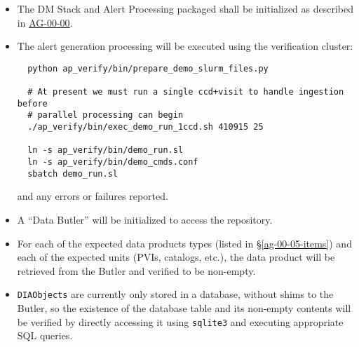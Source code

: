 \begin{itemize}

  \item{The DM Stack and Alert Processing packaged shall be initialized 
  as described in \hyperref[ag-00-00]{AG-00-00}.}

  \item{The alert generation processing will be executed using the verification cluster:

  \begin{verbatim}
  python ap_verify/bin/prepare_demo_slurm_files.py

  # At present we must run a single ccd+visit to handle ingestion before 
  # parallel processing can begin
  ./ap_verify/bin/exec_demo_run_1ccd.sh 410915 25

  ln -s ap_verify/bin/demo_run.sl
  ln -s ap_verify/bin/demo_cmds.conf
  sbatch demo_run.sl
  \end{verbatim}

  and any errors or failures reported.}


  \item{A ``Data Butler'' will be initialized to access the repository.}

  \item{For each of the expected data products types (listed in \S\ref{ag-00-05-items})
  and each of the expected units (PVIs, catalogs, etc.), the data product will be
    retrieved from the Butler and verified to be non-empty.}

  \item{\texttt{DIAObjects} are currently only stored in a database, without
  shims to the Butler, so the existence of the database table and its
  non-empty contents will be verified by directly accessing it using
  \texttt{sqlite3} and executing appropriate SQL queries.}

\end{itemize}
